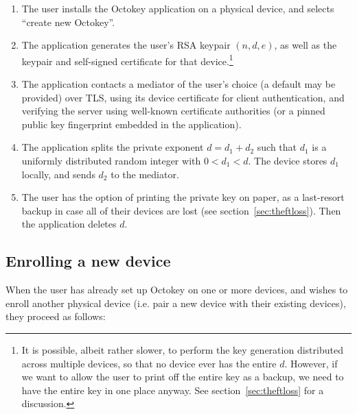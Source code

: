 \begin{enumerate}
\item The user installs the Octokey application on a physical device, and selects ``create new
Octokey''.
\item The application generates the user's RSA keypair $(n, d, e)$, as well as the keypair and
self-signed certificate for that device.\footnote{It is possible, albeit rather slower, to perform
the key generation distributed across multiple devices, so that no device ever has the entire $d$.
\cite{Boneh01b} However, if we want to allow the user to print off the entire key as a backup, we
need to have the entire key in one place anyway. See section~\ref{sec:theftloss} for a discussion.}
\item The application contacts a mediator of the user's choice (a default may be provided) over TLS,
using its device certificate for client authentication, and verifying the server using well-known
certificate authorities (or a pinned public key fingerprint embedded in the application).
\item The application splits the private exponent $d = d_1 + d_2$ such that $d_1$ is a uniformly
distributed random integer with $0 < d_1 < d$. The device stores $d_1$ locally, and sends $d_2$ to
the mediator.
\item The user has the option of printing the private key on paper, as a last-resort backup in case
all of their devices are lost (see section~\ref{sec:theftloss}). Then the application deletes $d$.
\end{enumerate}

\subsection{Enrolling a new device}\label{sec:newdevice}

When the user has already set up Octokey on one or more devices, and wishes to enroll another
physical device (i.e. pair a new device with their existing devices), they proceed as follows:


